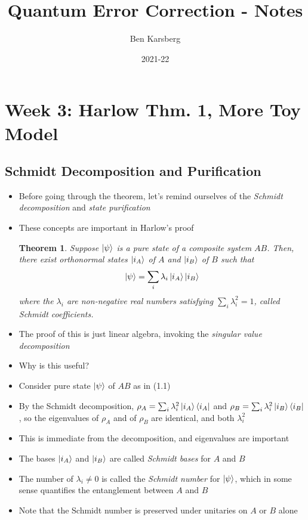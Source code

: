 \documentclass[12pt,a4paper]{article}
\title{Quantum Error Correction - Notes}
\author{Ben Karsberg}
\date{2021-22}
\numberwithin{equation}{section}
\newcommand{\ketbra}[2]{\ket{#1}\bra{#2}}
\newcommand{\ketbras}[1]{\ketbra{#1}{#1}}
\begin{document}
	\maketitle
	\section{Week 3: Harlow Thm. 1, More Toy Model}
	\subsection{Schmidt Decomposition and Purification}
	\begin{itemize}
		\item Before going through the theorem, let's remind ourselves of the \textit{Schmidt decomposition} and \textit{state purification}
		\item These concepts are important in Harlow's proof
		\newtheorem{theorem}{Theorem}
		\begin{theorem}
			Suppose $\ket{\psi}$ is a pure state of a composite system $AB$. Then, there exist orthonormal states $\ket{i_{A}}$ of $A$ and $\ket{i_{B}}$ of $B$ such that
			\begin{equation}
				\ket{\psi}=\sum_{i}\lambda_{i}\ket{i_{A}}\ket{i_{B}}
			\end{equation}
			where the $\lambda_{i}$ are non-negative real numbers satisfying $\sum_{i}\lambda^{2}_{i}=1$, called Schmidt coefficients.
		\end{theorem}
		\item The proof of this is just linear algebra, invoking the \textit{singular value decomposition}
		\item Why is this useful?
		\item Consider pure state $\ket{\psi}$ of $AB$ as in (1.1)
		\item By the Schmidt decomposition, $\rho_{A}=\sum_{i}\lambda_{i}^{2}\ketbras{i_{A}}$ and $\rho_{B}=\sum_{i}\lambda_{i}^{2}\ketbras{i_{B}}$, so the eigenvalues of $\rho_{A}$ and of $\rho_{B}$ are identical, and both $\lambda_{i}^{2}$
		\item This is immediate from the decomposition, and eigenvalues are important
		\item The bases $\ket{i_{A}}$ and $\ket{i_{B}}$ are called \textit{Schmidt bases} for $A$ and $B$
		\item The number of $\lambda_{i}\neq 0$ is called the \textit{Schmidt number} for $\ket{\psi}$, which in some sense quantifies the entanglement between $A$ and $B$
		\item Note that the Schmidt number is preserved under unitaries on $A$ or $B$ alone

\end{itemize}
\end{document}
